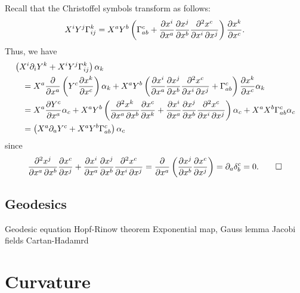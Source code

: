 \documentclass{../../large}
\renewcommand{\a}{\alpha}
\begin{document}
\begin{pf}
Recall that the Christoffel symbols transform as follows:
\[X^iY^j\Gamma_{ij}^k=X^aY^b\left(\Gamma_{ab}^c+\pd{x^i}{x^a}\pd{x^j}{x^b}\pd[2]{x^c}{x^i}{x^j}\right)\pd{x^k}{x^c}.\]
Thus, we have
\begin{align*}
&\left(X^i\pd_iY^k+X^iY^j\Gamma_{ij}^k\right)\a_k\\
&\quad=X^a\pd{x^a}\left(Y^c\pd{x^k}{x^c}\right)\a_k+X^aY^b\left(\pd{x^i}{x^a}\pd{x^j}{x^b}\pd[2]{x^c}{x^i}{x^j}+\Gamma_{ab}^c\right)\pd{x^k}{x^c}\a_k\\
&\quad=X^a\pd{Y^c}{x^a}\a_c+X^aY^b\left(\pd[2]{x^k}{x^a}{x^b}\pd{x^c}{x^k}+\pd{x^i}{x^a}\pd{x^j}{x^b}\pd[2]{x^c}{x^i}{x^j}\right)\a_c+X^aX^b\Gamma_{ab}^c\a_c\\
&\quad=\left(X^a\pd_aY^c+X^aY^b\Gamma_{ab}^c\right)\a_c
\end{align*}
since
\[\pd[2]{x^j}{x^a}{x^b}\pd{x^c}{x^j}+\pd{x^i}{x^a}\pd{x^j}{x^b}\pd[2]{x^c}{x^i}{x^j}=\pd{x^a}\left(\pd{x^j}{x^b}\pd{x^c}{x^j}\right)=\pd_a\delta_b^c=0.\qedhere\]
\end{pf}




\section{Geodesics}
Geodesic equation
Hopf-Rinow theorem
Exponential map, Gauss lemma
Jacobi fields
Cartan-Hadamrd






\chapter{Curvature}




\chapter{}
\end{document}
